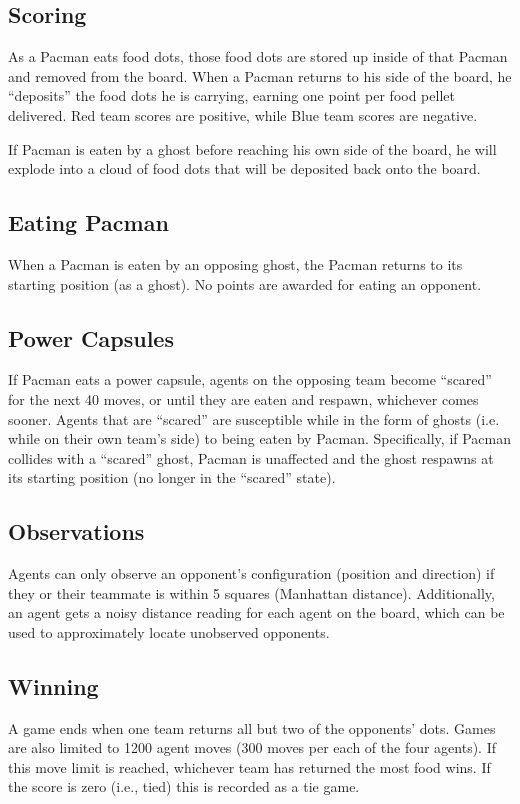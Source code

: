 \documentclass[11pt]{article}
\begin{document}
\subsection{Scoring}
As a Pacman eats food dots, those food dots are stored up inside of that Pacman and removed from the board. When a Pacman returns to his side of the board, he ``deposits'' the food dots he is carrying, earning one point per food pellet delivered. Red team scores are positive, while Blue team scores are negative.

If Pacman is eaten by a ghost before reaching his own side of the board, he will explode into a cloud of food dots that will be deposited back onto the board.

\subsection{Eating Pacman}
When a Pacman is eaten by an opposing ghost, the Pacman returns to its starting position (as a ghost). No points are awarded for eating an opponent.

\subsection{Power Capsules}
If Pacman eats a power capsule, agents on the opposing team become ``scared'' for the next 40 moves, or until they are eaten and respawn, whichever comes sooner. Agents that are ``scared'' are susceptible while in the form of ghosts (i.e. while on their own team's side) to being eaten by Pacman. Specifically, if Pacman collides with a ``scared'' ghost, Pacman is unaffected and the ghost respawns at its starting position (no longer in the ``scared'' state).

\subsection{Observations}
Agents can only observe an opponent's configuration (position and direction) if they or their teammate is within 5 squares (Manhattan distance). Additionally, an agent gets a noisy distance reading for each agent on the board, which can be used to approximately locate unobserved opponents.

\subsection{Winning}
A game ends when one team returns all but two of the opponents' dots. Games are also limited to 1200 agent moves (300 moves per each of the four agents). If this move limit is reached, whichever team has returned the most food wins. If the score is zero (i.e., tied) this is recorded as a tie game.
\end{document}
